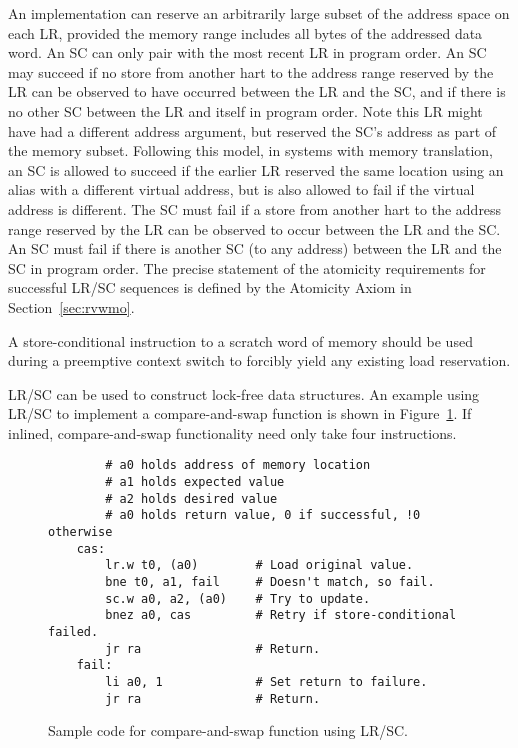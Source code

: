 An implementation can reserve an arbitrarily large subset of the
address space on each LR, provided the memory range includes all bytes
of the addressed data word.
An SC can only pair with the most recent LR in program order.  An SC
may succeed if no store from another hart to the address range
reserved by the LR can be observed to have occurred between the LR and
the SC, and if there is no other SC between the LR and itself in
program order.  Note this LR might have had a different address
argument, but reserved the SC's address as part of the memory subset.
Following this model, in systems with memory translation, an SC is
allowed to succeed if the earlier LR reserved the same location using
an alias with a different virtual address, but is also allowed to fail
if the virtual address is different.  The SC must fail if a store from
another hart to the address range reserved by the LR can be observed
to occur between the LR and the SC.  An SC must fail if there is
another SC (to any address) between the LR and the SC in program
order.  The precise statement of the atomicity requirements for
successful LR/SC sequences is defined by the Atomicity Axiom in
Section~\ref{sec:rvwmo}.

\begin{commentary}
A store-conditional instruction to a scratch word of memory should be used
during a preemptive context switch to forcibly yield any existing load
reservation.
\end{commentary}

LR/SC can be used to construct lock-free data structures.  An example
using LR/SC to implement a compare-and-swap function is shown in
Figure~\ref{cas}.  If inlined, compare-and-swap functionality need
only take four instructions.

\begin{figure}[h!]
\begin{center}
\begin{verbatim}
        # a0 holds address of memory location 
        # a1 holds expected value
        # a2 holds desired value
        # a0 holds return value, 0 if successful, !0 otherwise
    cas:
        lr.w t0, (a0)        # Load original value.
        bne t0, a1, fail     # Doesn't match, so fail.
        sc.w a0, a2, (a0)    # Try to update.
        bnez a0, cas         # Retry if store-conditional failed.
        jr ra                # Return.
    fail:
        li a0, 1             # Set return to failure.
        jr ra                # Return.
\end{verbatim}
\end{center}
\caption{Sample code for compare-and-swap function using LR/SC.}
\label{cas}
\end{figure}

